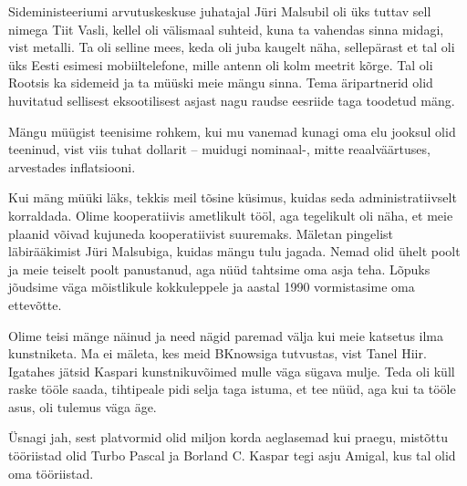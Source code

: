 Sideministeeriumi arvutuskeskuse juhatajal Jüri Malsubil oli üks tuttav 
sell nimega Tiit Vasli, kellel oli välismaal suhteid, 
kuna ta vahendas sinna midagi, vist metalli. Ta oli selline mees, keda oli juba kaugelt näha, sellepärast et tal oli 
üks Eesti esimesi mobiiltelefone, mille antenn oli kolm meetrit kõrge. 
Tal oli Rootsis ka sidemeid 
ja ta müüski meie mängu sinna. Tema äripartnerid 
olid huvitatud sellisest eksootilisest asjast nagu raudse eesriide taga 
toodetud mäng. 

Mängu müügist teenisime rohkem, kui mu vanemad kunagi oma 
elu jooksul olid teeninud, vist viis tuhat dollarit -- muidugi nominaal-, mitte reaalväärtuses, arvestades 
inflatsiooni. 

Kui mäng müüki läks, tekkis meil tõsine küsimus, kuidas seda administratiivselt 
korraldada. Olime kooperatiivis ametlikult tööl, aga tegelikult oli
näha, et meie plaanid võivad kujuneda kooperatiivist suuremaks. Mäletan pingelist läbirääkimist Jüri Malsubiga, 
kuidas mängu tulu jagada. Nemad olid ühelt poolt ja meie 
teiselt poolt panustanud, aga nüüd tahtsime oma asja teha. Lõpuks jõudsime 
väga mõistlikule kokkuleppele ja aastal 1990 vormistasime oma ettevõtte. 


Olime teisi mänge näinud ja need nägid paremad välja kui 
meie katsetus ilma kunstniketa. Ma ei mäleta, kes meid 
BKnowsiga tutvustas, vist Tanel 
Hiir. Igatahes jätsid Kaspari kunstnikuvõimed 
mulle väga sügava mulje. Teda oli küll raske tööle saada, tihtipeale 
pidi selja taga istuma, et tee nüüd, aga kui ta tööle asus, oli tulemus väga 
äge. 


Üsnagi jah, sest platvormid olid miljon korda aeglasemad kui 
praegu, mistõttu tööriistad olid Turbo Pascal ja 
Borland C. Kaspar tegi asju Amigal, kus tal olid oma 
tööriistad.


